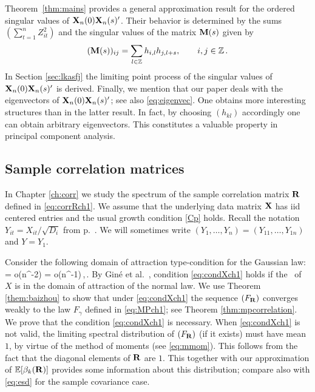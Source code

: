 Theorem~\ref{thm:mains} provides a general approximation result for the ordered singular values of ${\mathbf X}_n(0){\mathbf X}_n(s)'$. Their behavior is determined by the sums $(\sum_{t=1}^n Z_{it}^2)$ and the singular values of the matrix ${\mathbf M}(s)$ given by
\begin{equation*}
({\mathbf M}(s))_{ij}= \sum_{l\in \mathbb{Z}} h_{i,l} h_{j,l+s}, \qquad i,j \in \mathbb{Z} \,.
\end{equation*}
In Section \ref{sec:lkasfj} the limiting point process of the singular values of ${\mathbf X}_n(0){\mathbf X}_n(s)'$ is derived. 
Finally, we mention that our paper \cite{heiny:mikosch:2016:noniid1} deals with the eigenvectors of ${\mathbf X}_n(0){\mathbf X}_n(s)'$; see also \eqref{eq:eigenvec}. One obtains more interesting structures than in the latter result. In fact, by choosing $(h_{kl})$ accordingly one can obtain arbitrary eigenvectors. This constitutes a valuable property in principal component analysis.




\subsection{Sample correlation matrices}

In Chapter \ref{ch:corr} we study the spectrum of the sample correlation matrix ${\mathbf R}$ defined in \eqref{eq:corrRch1}. We assume that the underlying data matrix ${\mathbf X}$ has iid centered entries and the usual growth condition \eqref{Cp} holds. Recall the notation $Y_{it}=X_{it}/\sqrt{D_i}$ from p.~\pageref{eq:corrRch1}. We will sometimes write $(Y_1, \ldots, Y_n)= (Y_{11}, \ldots, Y_{1n})$ and $Y=Y_1$.
\par

Consider the following domain of attraction type-condition for the Gaussian law:
\beam\label{eq:condXch1}
\E \big[ Y_{1}Y_{2} \big] = o(n^{-2}) \quad  {} \quad  \E \big[ Y^4 \big] = o(n^{-1})\,,\qquad \nto\,.
\eeam
By Gin{\'e} et al.~\cite{gine:goetze:mason:1997}, condition \eqref{eq:condXch1} holds if the \ds\ of 
$X$ is in the domain of attraction of the normal law. We use Theorem \ref{them:baizhou} to  show that under \eqref{eq:condXch1} the sequence $(F_{{\mathbf R}})$ converges weakly to the \MP law $F_{\gamma}$ defined in \eqref{eq:MPch1}; see Theorem \ref{thm:mpcorrelation}. We prove that the condition \eqref{eq:condXch1} is necessary. When \eqref{eq:condXch1} is not valid, the limiting spectral distribution of $(F_{{\mathbf R}})$ (if it exists) must have mean $1$, by virtue of the method of moments (see \eqref{eq:mmom}). This follows from the fact that the diagonal elements of ${\mathbf R}$ are $1$.
This together with our approximation of $\mathbb{E} [\beta_k({\mathbf R})]$ provides some information about this distribution; compare also with \eqref{eq:esd} for the sample covariance case.
\par

